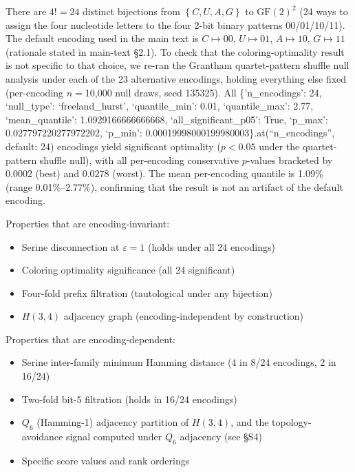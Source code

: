 \documentclass[preprint,11pt,authoryear,a4paper]{elsarticle}
\begin{document}
There are \(4! = 24\) distinct bijections from
\(\left\{ C,U,A,G \right\}\) to \({\text{GF}(2)}^{2}\) (24 ways to
assign the four nucleotide letters to the four 2-bit binary patterns
00/01/10/11). The default encoding used in the main text is
\(C \mapsto 00\), \(U \mapsto 01\), \(A \mapsto 10\), \(G \mapsto 11\)
(rationale stated in main-text §2.1). To check that the
coloring-optimality result is not specific to that choice, we re-ran the
Grantham quartet-pattern shuffle null analysis under each of the 23
alternative encodings, holding everything else fixed (per-encoding
\(n =\)10,000 null draws, seed 135325). All \{'n\_encodings': 24,
`null\_type': `freeland\_hurst', `quantile\_min': 0.01, `quantile\_max':
2.77, `mean\_quantile': 1.0929166666666668, `all\_significant\_p05':
True, `p\_max': 0.027797220277972202, `p\_min':
0.00019998000199980003\}.at(``n\_encodings'', default: 24) encodings
yield significant optimality (\(p < 0.05\) under the quartet-pattern
shuffle null), with all per-encoding conservative \(p\)-values bracketed
by \(0.0002\) (best) and \(0.0278\) (worst). The mean per-encoding
quantile is 1.09\% (range 0.01\%--2.77\%), confirming that the result is
not an artifact of the default encoding.

Properties that are encoding-invariant:

\begin{itemize}
\item
  Serine disconnection at \(\varepsilon = 1\) (holds under all 24
  encodings)
\item
  Coloring optimality significance (all 24 significant)
\item
  Four-fold prefix filtration (tautological under any bijection)
\item
  \(H(3,4)\) adjacency graph (encoding-independent by construction)
\end{itemize}

Properties that are encoding-dependent:

\begin{itemize}
\item
  Serine inter-family minimum Hamming distance (4 in 8/24 encodings, 2
  in 16/24)
\item
  Two-fold bit-5 filtration (holds in 16/24 encodings)
\item
  \(Q_{6}\) (Hamming-1) adjacency partition of \(H(3,4)\), and the
  topology-avoidance signal computed under \(Q_{6}\) adjacency (see §S4)
\item
  Specific score values and rank orderings
\end{itemize}
\end{document}
